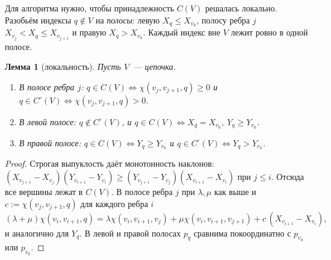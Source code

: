 \documentclass[a4paper,11pt]{article}
\theoremstyle{plain}
\newtheorem{lemma}[theorem]{Лемма}
\theoremstyle{definition}
\theoremstyle{remark}
\begin{document}
Для алгоритма нужно, чтобы принадлежность $C(V)$ решалась локально. Разобьём индексы $q\notin V$ на \emph{полосы}: левую $X_q\le X_{v_0}$, полосу ребра $j$ $X_{v_j}<X_q\le X_{v_{j+1}}$ и правую $X_q>X_{v_k}$. Каждый индекс вне $V$ лежит ровно в одной полосе.

\begin{lemma}[локальность]\label{lem:local}
    Пусть $V$~--- цепочка.
    \begin{enumerate}[label=(\alph*)]
        \item В полосе ребра $j$: $q\in C(V)\iff\chi(v_j,v_{j+1},q)\ge0$ и $q\in C^\circ(V)\iff\chi(v_j,v_{j+1},q)>0$.
        \item В левой полосе: $q\notin C^\circ(V)$, и $q\in C(V)\iff X_q=X_{v_0},\ Y_q\ge Y_{v_0}$.
        \item В правой полосе: $q\in C(V)\iff Y_q\ge Y_{v_k}$ и $q\in C^\circ(V)\iff Y_q>Y_{v_k}$.
    \end{enumerate}
\end{lemma}

\begin{proof}
    Строгая выпуклость даёт монотонность наклонов: $(X_{v_{j+1}}-X_{v_j})(Y_{v_{i+1}}-Y_{v_i})\ge(Y_{v_{j+1}}-Y_{v_j})(X_{v_{i+1}}-X_{v_i})$ при $j\le i$. Отсюда все вершины лежат в $C(V)$. В полосе ребра $j$ при $\lambda,\mu$ как выше и $c:=\chi(v_j,v_{j+1},q)$ для каждого ребра $i$
    \[
        (\lambda+\mu)\chi(v_i,v_{i+1},q)=\lambda\chi(v_i,v_{i+1},v_j)+\mu\chi(v_i,v_{i+1},v_{j+1})+c\,(X_{v_{i+1}}-X_{v_i}),
    \]
    и аналогично для $Y_q$. В левой и правой полосах $p_q$ сравнима покоординатно с $p_{v_0}$ или $p_{v_k}$.
\end{proof}
\end{document}
